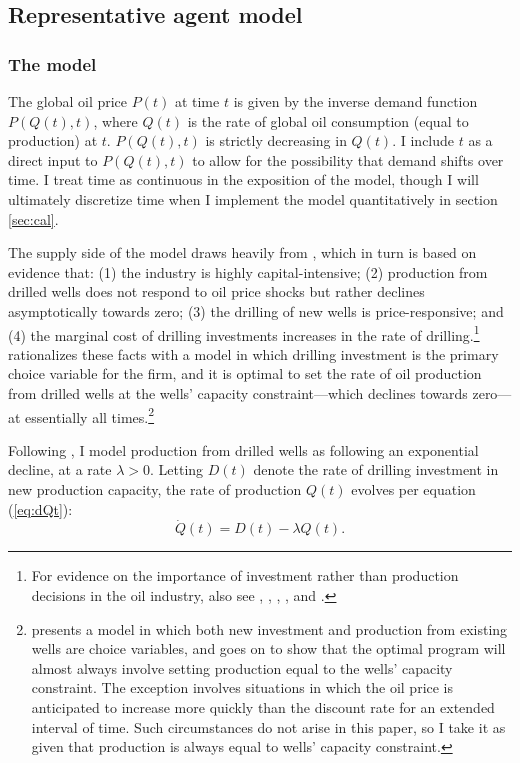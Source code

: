 \documentclass[12pt]{article}
\begin{document}
\subsection{Representative agent model} \label{sec:model_rep}

\subsubsection{The model}

The global oil price $P(t)$ at time $t$ is given by the inverse demand function $P(Q(t),t)$, where $Q(t)$ is the rate of global oil consumption (equal to production) at $t$. $P(Q(t),t)$ is strictly decreasing in $Q(t)$. I include $t$ as a direct input to $P(Q(t),t)$ to allow for the possibility that demand shifts over time. I treat time as continuous in the exposition of the model, though I will ultimately discretize time when I implement the model quantitatively in section \ref{sec:cal}.

The supply side of the model draws heavily from \cite{aks2018}, which in turn is based on evidence that: (1) the industry is highly capital-intensive; (2) production from drilled wells does not respond to oil price shocks but rather declines asymptotically towards zero; (3) the drilling of new wells is price-responsive; and (4) the marginal cost of drilling investments increases in the rate of drilling.\footnote{For evidence on the importance of investment rather than production decisions in the oil industry, also see  \cite{nystad1987}, \cite{adelman1990}, \cite{thompson2001}, \cite{kellogg2014}, and \cite{np2019}.} \cite{aks2018} rationalizes these facts with a model in which drilling investment is the primary choice variable for the firm, and it is optimal to set the rate of oil production from drilled wells at the wells' capacity constraint---which declines towards zero---at essentially all times.\footnote{\cite{aks2018} presents a model in which both new investment and production from existing wells are choice variables, and goes on to show that the optimal program will almost always involve setting production equal to the wells' capacity constraint. The exception involves situations in which the oil price is anticipated to increase more quickly than the discount rate for an extended interval of time. Such circumstances do not arise in this paper, so I take it as given that production is always equal to wells' capacity constraint.} 

Following \cite{aks2018}, I model production from drilled wells as following an exponential decline, at a rate $\lambda>0$. Letting $D(t)$ denote the rate of drilling investment in new production capacity, the rate of production $Q(t)$ evolves per equation (\ref{eq:dQt}):
\begin{equation}
\dot{Q}(t) = D(t) - \lambda Q(t).	\label{eq:dQt}
\end{equation}
\end{document}
